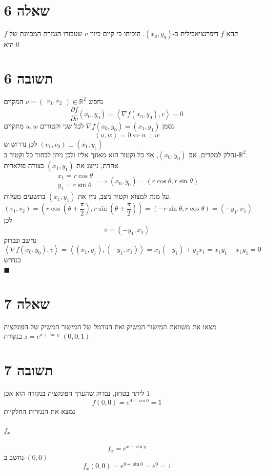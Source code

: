 \documentclass[12pt, titlepage]{article}
\newcommand{\pard}[2][f]{\frac{\partial #1}{\partial #2}}
\begin{document}
\part*{שאלה 6}
תהא $f$ דיפרנציאבילית ב-$\left(x_0,y_0\right)$. הוכיחו כי קיים כיוון $v$ שעבורו הנגזרת המכוונת של $f$ היא $0$
\part*{תשובה 6}
נחפש $v = \begin{pmatrix}
    v_1,v_2
\end{pmatrix} \in \mathbb{R}^2$ המקיים
\[
  \pard{v} \left(x_0,y_0\right) = \left<\nabla f\left(x_0,y_0\right), v \right> = 0
\]
נסמן $\nabla f\left(x_0,y_0\right) = \left(x_1,y_1\right)$
לכל שני וקטורים $u,w$ מתקיים
\[
    \left<u,w\right> = 0 \iff u \perp w
\]
לכן נדרוש ש $\left(v_1,v_2\right) \perp \left(x_1,y_1\right)$\\
נחלק למקרים,
אם $\left(x_0,y_0\right)$, אזי כל וקטור הוא מאונך אליו ולכן ניתן לבחור כל וקטור ב-$\mathbb{R}^2$.\\
אחרת, נייצג את $\left(x_1,y_1\right)$ בצורה פולארית
\[
\begin{gathered}
    x_1 = r \cos \theta\\
    y_1 = r \sin \theta
\end{gathered} \implies \left(x_0,y_0\right) = \left(r\cos\theta,r\sin\theta\right)
\]
על מנת למצוא וקטור ניצב, נזיז את $\left(x_1,y_1\right)$ בתשעים מעלות.
\[
    \left(v_1,v_2\right) = \left(r\cos\left(\theta + \frac{\pi}{2}\right),r\sin\left(\theta+\frac{\pi}{2}\right)\right) = \left(-r \sin\theta, r\cos\theta\right) = \left(-y_1,x_1\right)
\]
לכן
\[
    \boxed{v =\left( 
            -y_1,x_1
    \right)}
\]
נחשב ונבדוק
\[
\left<\nabla f\left(x_0,y_0\right),v\right>=\left<\left(x_1,y_1\right), \left(-y_1,x_1\right)\right>  = x_1 \left(-y_1\right) + y_1 x_1 = x_1y_1 - x_1y_1 = 0
\]
כנדרש\\
$\blacksquare$
\newpage
\part*{שאלה 7}
מצאו את משוואת המישור המשיק ואת הנורמל של המישור המשיק של הפונקציה $z=e^{x+\sin y}$ בנקודה $\left(0,0,1\right)$
\part*{תשובה 7}
ליתר בטחון, נבדוק שהערך הפונקציה בנקודה הוא אכן $1$
\[
    f\left(0,0\right) = e^{0+\sin 0} = 1
\]
נמצא את הנגזרות החלקיות
\subsection*{$f_x$}
\[
    f_x = e^{x+\sin y}
\]
נחשב ב-$\left(0,0\right)$
\[
    f_x\left(0,0\right) = e^{0+\sin 0}= e^0 = 1
    \]
\end{document}
